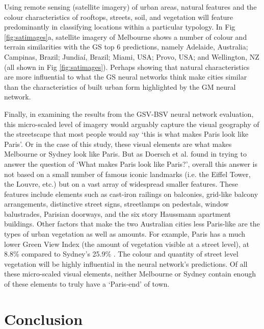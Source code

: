\documentclass[10pt,letterpaper,hidelinks]{article}
\begin{document}
Using remote sensing (satellite imagery) of urban areas, natural features and the colour characteristics of rooftops, streets, soil, and vegetation  will feature predominantly in classifying locations within a particular typology. In Fig \ref{fig:satimages}a, satellite imagery of Melbourne shows a number of colour and terrain similarities with the GS top 6 predictions, namely Adelaide, Australia; Campinas, Brazil; Jundia\'{i}, Brazil; Miami, USA; Provo, USA; and Wellington, NZ (all shown in Fig \ref{fig:satimages}). Perhaps showing that natural characteristics are more influential to what the GS neural networks think make cities similar than the characteristics of built urban form highlighted by the GM neural network.

Finally, in examining the results from the GSV-BSV neural network evaluation, this micro-scaled level of imagery would arguably capture the visual geography of the streetscape that most people would say `this is what makes Paris look like Paris'. Or in the case of this study, these visual elements are what makes Melbourne or Sydney look like Paris. But as Doersch et al. \cite{Doersch2012} found in trying to answer the question of `What makes Paris look like Paris?', overall this answer is not based on a small number of famous iconic landmarks (i.e. the Eiffel Tower, the Louvre, etc.) but on a vast array of widespread smaller features. These features include elements such as cast-iron railings on balconies, grid-like balcony arrangements, distinctive street signs, streetlamps on pedestals, window balustrades, Parisian doorways, and the six story Haussmann apartment buildings. Other factors that make the two Australian cities less Paris-like are the types of urban vegetation as well as amounts. For example, Paris has a much lower Green View Index (the amount of vegetation visible at a street level), at 8.8\% compared to Sydney's 25.9\% \cite{Li2015}. The colour and quantity of street level vegetation will be highly influential in the neural network's predictions. Of all these micro-scaled visual elements, neither Melbourne or Sydney contain enough of these elements to truly have a `Paris-end' of town.

\section*{Conclusion}\label{sec:conclusion}
\end{document}
